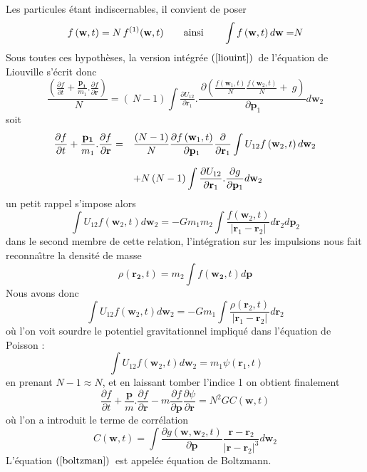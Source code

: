 {Les particules \'{e}tant indiscernables, il convient de poser}
\[
f\left(  \mathbf{w},t\right)  =N\,f^{(1)}(\mathbf{w},t)\qquad\text{ainsi\qquad
}\int f\left(  \mathbf{w},t\right)  d\mathbf{w=}N
\]
{Sous toutes ces hypoth\`{e}ses, la version int\'{e}gr\'{e}e }$\left(
\ref{liouint}\right)  ${\ de l'\'{e}quation de {Liouville} s'\'{e}crit donc }
\[
\frac{\left(  \frac{\partial f}{\partial t}+\frac{\mathbf{p_{1}}}{m_{1}}%
.\frac{\partial f}{\partial\mathbf{r}}\right)  }{{\ N}}=\left(  {\ N-1}%
\right)  \displaystyle\int\tfrac{\partial U_{12}}{\partial\mathbf{r}_{1}%
}.\frac{{\ \partial}\left(  \frac{f\left(  \mathbf{w}_{1},t\right)  }{N}%
\frac{f\left(  \mathbf{w}_{2},t\right)  }{N}+{\ g}\right)  }{{\ \partial
}\mathbf{p}_{1}}d\mathbf{w}_{2}%
\]
{soit }
\[%
\begin{array}
[c]{ll}%
\dfrac{\partial f}{\partial t}+\dfrac{\mathbf{p_{1}}}{m_{1}}.\dfrac{\partial
f}{\partial\mathbf{r}}= & \dfrac{\left(  N-1\right)  }{N}\dfrac{\partial
f\left(  \mathbf{w}_{1},t\right)  }{\partial\mathbf{p}_{1}}\dfrac{\partial
}{\partial\mathbf{r}_{1}}\displaystyle\int U_{12}f\left(  \mathbf{w}%
_{2},t\right)  d\mathbf{w}_{2}\\
& \\
& +N\left(  N-1\right)  \displaystyle\int\dfrac{\partial U_{12}}%
{\partial\mathbf{r}_{1}}.\dfrac{\partial g}{\partial\mathbf{p}_{1}}%
d\mathbf{w}_{2}%
\end{array}
\]
un petit rappel s'impose alors
\[
\displaystyle\int U_{12}f\left(  \mathbf{w}_{2},t\right)  d\mathbf{w}%
_{2}=-Gm_{1}m_{2}\displaystyle\int\dfrac{f\left(  \mathbf{w}_{2},t\right)
}{\left\vert \mathbf{r}_{1}-\mathbf{r}_{2}\right\vert }d\mathbf{r}%
_{2}d\mathbf{p}_{2}%
\]
{dans le second membre de cette relation, l'int\'{e}gration sur les
{impulsion}s nous fait reconna\^{\i}tre la densit\'{e} de masse}
\[
\rho\left(  \mathbf{r_{2}},t\right)  =m_{2}\displaystyle\int f\left(
\mathbf{w_{2}},t\right)  d\mathbf{p}%
\]
{Nous avons donc}
\[
\displaystyle\int U_{12}f\left(  \mathbf{w}_{2},t\right)  d\mathbf{w}%
_{2}=-Gm_{1}\displaystyle\int\dfrac{\rho\left(  \mathbf{r}_{2},t\right)
}{\left\vert \mathbf{r}_{1}-\mathbf{r}_{2}\right\vert }d\mathbf{r}_{2}%
\]
{o\`{u} l'on voit sourdre le {potentiel} gravitationnel impliqu\'{e} dans
l'\'{e}quation de
{Poisson} :}
\[
\displaystyle{\ \int U_{12}f\left(  \mathbf{w}_{2},t\right)  d\mathbf{w}%
_{2}=m_{1}\psi\left(  \mathbf{r}_{1},t\right)  }%
\]
en prenant $N-1\approx N$, et en laissant tomber l'indice 1 on obtient
finalement
\begin{equation}
\frac{\partial f}{\partial t}+\frac{\mathbf{p}}{m}.\frac{\partial f}%
{\partial\mathbf{r}}-m\frac{\partial f}{\partial\mathbf{p}}\frac{\partial\psi
}{\partial\mathbf{r}}=N^{2}GC\left(  \mathbf{w},t\right)  \label{boltzman}%
\end{equation}
{o\`{u} l'on a introduit le terme de corr\'{e}lation }
\[
C\left(  \mathbf{w},t\right)  =\displaystyle\int\dfrac{\partial g\left(
\mathbf{w},\mathbf{w}_{2},t\right)  }{\partial\mathbf{p}}\dfrac{\mathbf{r}%
-\mathbf{r}_{2}}{\left\vert \mathbf{r}-\mathbf{r}_{2}\right\vert ^{3}%
}d\mathbf{w}_{2}%
\]
{L'\'{e}quation }$\left(  \ref{boltzman}\right)  ${\ est appel\'{e}e
\'{e}quation de {Boltzmann}.}

